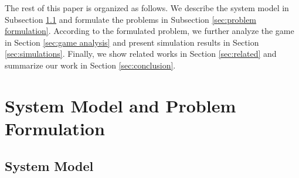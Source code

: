 \documentclass[twocolumn,10pt]{IEEEtran}
\begin{document}


The rest of this paper is organized as follows. We describe the system model in Subsection \ref{sec:system model} and formulate the problems in Subsection \ref{sec:problem formulation}. According to the formulated problem, we further analyze the game in Section \ref{sec:game analysis} and present simulation results in Section \ref{sec:simulations}. Finally, we show related works in Section \ref{sec:related} and summarize our work in Section \ref{sec:conclusion}.



\section{System Model and Problem Formulation}\label{sec:system model and problem formulation}




\subsection{System Model}\label{sec:system model}
\end{document}
